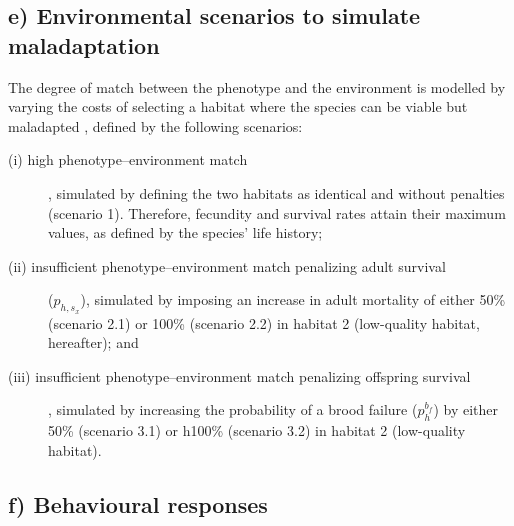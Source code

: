 \subsection*{e) Environmental scenarios to simulate maladaptation}

The degree of match between the phenotype and the environment
is modelled by varying the costs of selecting a habitat
where the species can be viable but maladapted \citep{Kisdi2002}, defined
by the following scenarios:
\begin{description}
  \item[(i) high phenotype–environment match], simulated by defining
    the two habitats as identical and without penalties
    (scenario 1). Therefore, fecundity and survival rates
    attain their maximum values, as defined by the species’
    life history;
  \item[(ii) insufficient phenotype–environment match penalizing adult
    survival] ($p_{h,s_{x}}$), simulated by imposing an increase in
    adult mortality of either 50\% (scenario 2.1) or 100\% (scenario
    2.2) in habitat 2 (low-quality habitat, hereafter); and
  \item[(iii) insufficient phenotype–environment match penalizing offspring
    survival], simulated by increasing the probability
    of a brood failure ($p^{b_{f}}_{h}$) by either 50\% (scenario 3.1) or
    h100\% (scenario 3.2) in habitat 2 (low-quality habitat).
\end{description}


\subsection*{f) Behavioural responses}

